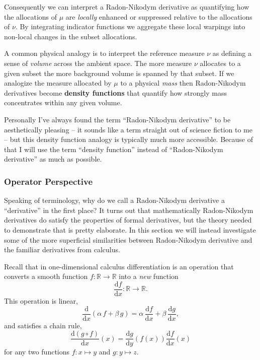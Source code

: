 \documentclass[
  letterpaper,
  DIV=11,
  numbers=noendperiod]{scrartcl}
\begin{document}
Consequently we can interpret a Radon-Nikodym derivative as quantifying
how the allocations of \(\mu\) are \emph{locally} enhanced or suppressed
relative to the allocations of \(\nu\). By integrating indicator
functions we aggregate these local warpings into non-local changes in
the subset allocations.

A common physical analogy is to interpret the reference measure \(\nu\)
as defining a sense of \emph{volume} across the ambient space. The more
measure \(\nu\) allocates to a given subset the more background volume
is spanned by that subset. If we analogize the measure allocated by
\(\mu\) to a physical \emph{mass} then Radon-Nikodym derivatives become
\textbf{density functions} that quantify how strongly mass concentrates
within any given volume.

Personally I've always found the term ``Radon-Nikodym derivative'' to be
aesthetically pleasing -- it sounds like a term straight out of science
fiction to me -- but this density function analogy is typically much
more accessible. Because of that I will use the term ``density
function'' instead of ``Radon-Nikodym derivative'' as much as possible.

\hypertarget{operator-perspective}{%
\subsubsection{Operator Perspective}\label{operator-perspective}}

Speaking of terminology, why do we call a Radon-Nikodym derivative a
``derivative'' in the first place? It turns out that mathematically
Radon-Nikodym derivatives do satisfy the properties of formal
derivatives, but the theory needed to demonstrate that is pretty
elaborate. In this section we will instead investigate some of the more
superficial similarities between Radon-Nikodym derivative and the
familiar derivatives from calculus.

Recall that in one-dimensional calculus differentiation is an operation
that converts a smooth function \(f: \mathbb{R} \rightarrow \mathbb{R}\)
into a \emph{new} function \[
\frac{ \mathrm{d} f }{ \mathrm{d} x} :
\mathbb{R} \rightarrow \mathbb{R}.
\] This operation is linear, \[
\frac{ \mathrm{d} }{ \mathrm{d} x}
\left( \alpha \, f + \beta \, g \right)
=
  \alpha \, \frac{ \mathrm{d} f }{ \mathrm{d} x}
+ \beta \, \frac{ \mathrm{d} g }{ \mathrm{d} x},
\] and satisfies a chain rule, \[
\frac{ \mathrm{d} (g \circ f)}{ \mathrm{d} x}(x)
=
\frac{ \mathrm{d} g}{ \mathrm{d} y}(f(x))
\frac{ \mathrm{d} f}{ \mathrm{d} x}(x)
\] for any two functions \(f: x \mapsto y\) and \(g: y \mapsto z\).
\end{document}

